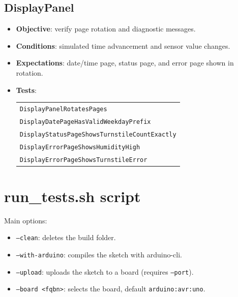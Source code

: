 \subsection{DisplayPanel}
\begin{itemize}
  \item \textbf{Objective}: verify page rotation and diagnostic messages.
  \item \textbf{Conditions}: simulated time advancement and sensor value changes.
  \item \textbf{Expectations}: date/time page, status page, and error page shown in rotation.
  \item \textbf{Tests}:
  \begin{tabular}[t]{@{}l@{}}
    \texttt{DisplayPanelRotatesPages}\\
    \texttt{DisplayDatePageHasValidWeekdayPrefix}\\
    \texttt{DisplayStatusPageShowsTurnstileCountExactly}\\
    \texttt{DisplayErrorPageShowsHumidityHigh}\\
    \texttt{DisplayErrorPageShowsTurnstileError}
  \end{tabular}
\end{itemize}

\section{run\_tests.sh script}
Main options:
\begin{itemize}
  \item \texttt{--clean}: deletes the build folder.
  \item \texttt{--with-arduino}: compiles the sketch with arduino-cli.
  \item \texttt{--upload}: uploads the sketch to a board (requires \texttt{--port}).
  \item \texttt{--board <fqbn>}: selects the board, default \texttt{arduino:avr:uno}.
\end{itemize}

